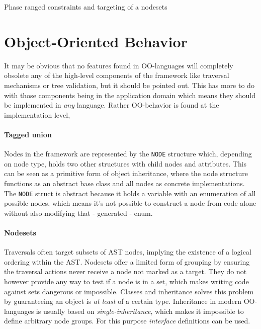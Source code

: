 \documentclass[twoside,openright]{uva-bachelor-thesis}
\newcommand{\code}[1]{\texttt{\footnotesize#1}}
\begin{document}
			\begin{codebox}[label=c-targets]{Phase ranged constraints and targeting of a nodesets}
			\end{codebox}
		
		
	\section{Object-Oriented Behavior}
	\label{oofeatures}
		It may be obvious that no features found in OO-languages will completely obsolete any of the high-level components of the framework like traversal mechanisms or tree validation, but it should be pointed out. This has more to do with those components being in the application domain which means they should be implemented in \emph{any} language. Rather OO-behavior is found at the implementation level, 
			
		\paragraph{Tagged union}
			Nodes in the framework are represented by the \code{NODE} structure which, depending on node type, holds two other structures with child nodes and attributes. This can be seen as a primitive form of object inheritance, where the node structure functions as an abstract base class and all nodes as concrete implementations. The \code{NODE} struct is abstract because it holds a variable with an enumeration of all possible nodes, which means it's not possible to construct a node from code alone without also modifying that - generated - enum.
			
		\paragraph{Nodesets}
			Traversals often target subsets of AST nodes, implying the existence of a logical ordering within the AST. Nodesets offer a limited form of grouping by ensuring the traversal actions never receive a node not marked as a target. They do not however provide any way to test if a node is in a set, which makes writing code against sets dangerous or impossible. Classes and inheritance solves this problem by guaranteeing an object is \emph{at least} of a certain type. Inheritance in modern OO-languages is usually based on \emph{single-inheritance}, which makes it impossible to define arbitrary node groups. For this purpose \emph{interface} definitions can be used.
			
\end{document}
